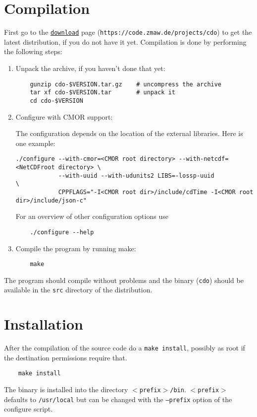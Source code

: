 \section{Compilation}

First go to the {\CDO}  \href{https://code.zmaw.de/projects/cdo}{\texttt{download}} page
(\texttt{https://code.zmaw.de/projects/cdo}) to get the latest distribution,
if you do not have it yet.
Compilation is done by performing the following steps:

\begin{enumerate}
\item Unpack the archive, if you haven't done that yet:
   
\begin{verbatim}
    gunzip cdo-$VERSION.tar.gz    # uncompress the archive
    tar xf cdo-$VERSION.tar       # unpack it
    cd cdo-$VERSION
\end{verbatim}

\item Configure {\CDO} with CMOR support:

The configuration depends on the location of the external libraries. Here is one example:

\begin{verbatim}
./configure --with-cmor=<CMOR root directory> --with-netcdf=<NetCDFroot directory> \
            --with-uuid --with-udunits2 LIBS=-lossp-uuid                           \
            CPPFLAGS="-I<CMOR root dir>/include/cdTime -I<CMOR root dir>/include/json-c"
\end{verbatim}

For an overview of other configuration options use

\begin{verbatim}
    ./configure --help
\end{verbatim}

\item Compile the program by running make:

\begin{verbatim}
    make
\end{verbatim}

\end{enumerate}

The program should compile without problems and the binary (\texttt{cdo}) 
should be available in the \texttt{src} directory of the distribution.


\section{Installation}

After the compilation of the source code do a \texttt{make install},
possibly as root if the destination permissions require that.

\begin{verbatim}
    make install
\end{verbatim} 

The binary is installed into the directory \texttt{$<$prefix$>$/bin}.
\texttt{$<$prefix$>$} defaults to \texttt{/usr/local} but can be changed with 
the \texttt{--prefix} option of the configure script. 

